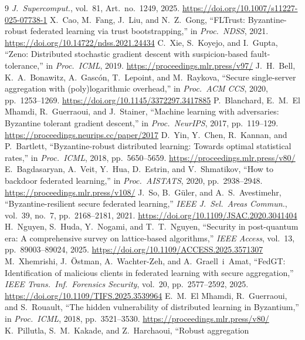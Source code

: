 \documentclass[lettersize,journal]{IEEEtran}
\begin{document}
\begin{thebibliography}{9}
\emph{J.\ Supercomput.}, vol.\ 81, Art.\ no.\ 1249, 2025. \url{https://doi.org/10.1007/s11227-025-07738-1}
 X.\ Cao, M.\ Fang, J.\ Liu, and N.\ Z.\ Gong, ``FLTrust:
Byzantine-robust federated learning via trust bootstrapping,'' in \emph{Proc.\ NDSS},
2021. \url{https://doi.org/10.14722/ndss.2021.24434}
 C.\ Xie, S.\ Koyejo, and I.\ Gupta, ``Zeno: Distributed stochastic
gradient descent with suspicion-based fault-tolerance,'' in \emph{Proc.\ ICML}, 2019. \url{https://proceedings.mlr.press/v97/}
 J.\ H.\ Bell, K.\ A.\ Bonawitz, A.\ Gasc\'on, T.\ Lepoint, and
M.\ Raykova, ``Secure single-server aggregation with (poly)logarithmic overhead,''
in \emph{Proc.\ ACM CCS}, 2020, pp.\ 1253--1269. \url{https://doi.org/10.1145/3372297.3417885}
 P.\ Blanchard, E.\ M.\ El Mhamdi, R.\ Guerraoui, and
J.\ Stainer, ``Machine learning with adversaries: Byzantine tolerant gradient
descent,'' in \emph{Proc.\ NeurIPS}, 2017, pp.\ 119--129. \url{https://proceedings.neurips.cc/paper/2017}
 D.\ Yin, Y.\ Chen, R.\ Kannan, and P.\ Bartlett,
``Byzantine-robust distributed learning: Towards optimal statistical rates,'' in
\emph{Proc.\ ICML}, 2018, pp.\ 5650--5659. \url{https://proceedings.mlr.press/v80/}
 E.\ Bagdasaryan, A.\ Veit, Y.\ Hua, D.\ Estrin, and
V.\ Shmatikov, ``How to backdoor federated learning,'' in \emph{Proc.\ AISTATS},
2020, pp.\ 2938--2948. \url{https://proceedings.mlr.press/v108/}
 J.\ So, B.\ G\"uler, and A.\ S.\ Avestimehr,
``Byzantine-resilient secure federated learning,'' \emph{IEEE J.\ Sel.\ Areas
Commun.}, vol.\ 39, no.\ 7, pp.\ 2168--2181, 2021. \url{https://doi.org/10.1109/JSAC.2020.3041404}
 H.\ Nguyen, S.\ Huda, Y.\ Nogami, and T.\ T.\ Nguyen,
``Security in post-quantum era: A comprehensive survey on lattice-based
algorithms,'' \emph{IEEE Access}, vol.\ 13, pp.\ 89003--89024, 2025. \url{https://doi.org/10.1109/ACCESS.2025.3571307}
 M.\ Xhemrishi, J.\ \"Ostman, A.\ Wachter-Zeh, and A.\ Graell~i~Amat,
``FedGT: Identification of malicious clients in federated learning with secure
aggregation,'' \emph{IEEE Trans.\ Inf.\ Forensics Security}, vol.\ 20,
pp.\ 2577--2592, 2025. \url{https://doi.org/10.1109/TIFS.2025.3539964}
 E.\ M.\ El Mhamdi, R.\ Guerraoui, and S.\ Rouault, ``The hidden
vulnerability of distributed learning in Byzantium,'' in \emph{Proc.\ ICML}, 2018,
pp.\ 3521--3530. \url{https://proceedings.mlr.press/v80/}
 K.\ Pillutla, S.\ M.\ Kakade, and Z.\ Harchaoui, ``Robust aggregation

\end{thebibliography}
\end{document}
